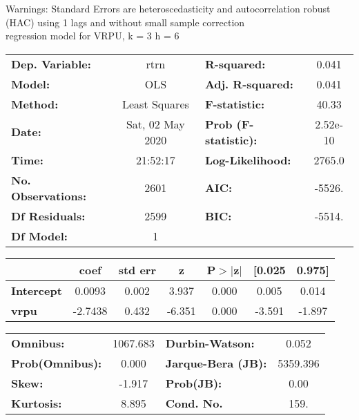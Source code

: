 Warnings: \newline
 [1] Standard Errors are heteroscedasticity and autocorrelation robust (HAC) using 1 lags and without small sample correction\\ 

regression model for VRPU, k = 3 h = 6\begin{center}
\begin{tabular}{lclc}
\toprule
\textbf{Dep. Variable:}    &       rtrn       & \textbf{  R-squared:         } &     0.041   \\
\textbf{Model:}            &       OLS        & \textbf{  Adj. R-squared:    } &     0.041   \\
\textbf{Method:}           &  Least Squares   & \textbf{  F-statistic:       } &     40.33   \\
\textbf{Date:}             & Sat, 02 May 2020 & \textbf{  Prob (F-statistic):} &  2.52e-10   \\
\textbf{Time:}             &     21:52:17     & \textbf{  Log-Likelihood:    } &    2765.0   \\
\textbf{No. Observations:} &        2601      & \textbf{  AIC:               } &    -5526.   \\
\textbf{Df Residuals:}     &        2599      & \textbf{  BIC:               } &    -5514.   \\
\textbf{Df Model:}         &           1      & \textbf{                     } &             \\
\bottomrule
\end{tabular}
\begin{tabular}{lcccccc}
                   & \textbf{coef} & \textbf{std err} & \textbf{z} & \textbf{P$> |$z$|$} & \textbf{[0.025} & \textbf{0.975]}  \\
\midrule
\textbf{Intercept} &       0.0093  &        0.002     &     3.937  &         0.000        &        0.005    &        0.014     \\
\textbf{vrpu}      &      -2.7438  &        0.432     &    -6.351  &         0.000        &       -3.591    &       -1.897     \\
\bottomrule
\end{tabular}
\begin{tabular}{lclc}
\textbf{Omnibus:}       & 1067.683 & \textbf{  Durbin-Watson:     } &    0.052  \\
\textbf{Prob(Omnibus):} &   0.000  & \textbf{  Jarque-Bera (JB):  } & 5359.396  \\
\textbf{Skew:}          &  -1.917  & \textbf{  Prob(JB):          } &     0.00  \\
\textbf{Kurtosis:}      &   8.895  & \textbf{  Cond. No.          } &     159.  \\
\bottomrule
\end{tabular}
\end{center}

